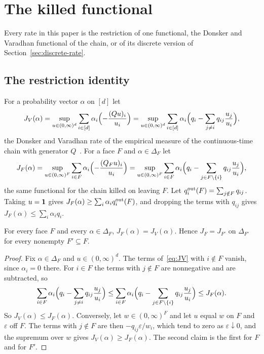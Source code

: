 \section{The killed functional}\label{sec:dv}

Every rate in this paper is the restriction of one functional, the Donsker and
Varadhan functional of the chain, or of its discrete version of
Section~\ref{sec:discrete-rate}.

\subsection{The restriction identity}\label{sec:restriction}

For a probability vector $\alpha$ on $[d]$ let
\begin{equation}\label{eq:JV}
 J_V(\alpha)=\sup_{u\in(0,\infty)^d}\sum_{i\in[d]}\alpha_i\Bigl(-\frac{(Qu)_i}{u_i}\Bigr)
 =\sup_{u\in(0,\infty)^d}\sum_{i\in[d]}\alpha_i\Bigl(q_i-\sum_{j\ne i}q_{ij}\frac{u_j}{u_i}\Bigr),
\end{equation}
the Donsker and Varadhan rate of the empirical measure of the continuous-time
chain with generator $Q$~\cite{dv1975}. For a face $F$ and $\alpha\in\Delta_F$ let
\[
 J_F(\alpha)=\sup_{u\in(0,\infty)^F}\sum_{i\in F}\alpha_i\Bigl(-\frac{(Q_Fu)_i}{u_i}\Bigr)
 =\sup_{u\in(0,\infty)^F}\sum_{i\in F}\alpha_i\Bigl(q_i-\sum_{j\in F\setminus\{i\}}q_{ij}\frac{u_j}{u_i}\Bigr),
\]
the same functional for the chain killed on leaving $F$. Let $q_i^{\rm out}(F)=\sum_{j\notin F}q_{ij}$. Taking $u=\mathbf{1}$
gives $J_F(\alpha)\ge\sum_i\alpha_iq_i^{\rm out}(F)$, and dropping the terms
with $q_{ij}$ gives $J_F(\alpha)\le\sum_i\alpha_iq_i$.

\begin{proposition}\label{prop:restriction}
For every face $F$ and every $\alpha\in\Delta_F$, $J_F(\alpha)=J_V(\alpha)$. Hence
$J_F=J_{F'}$ on $\Delta_{F'}$ for every nonempty $F'\subseteq F$.
\end{proposition}

\begin{proof}
Fix $\alpha\in\Delta_F$ and $u\in(0,\infty)^d$. The terms of~\eqref{eq:JV} with
$i\notin F$ vanish, since $\alpha_i=0$ there. For $i\in F$ the terms with
$j\notin F$ are nonnegative and are subtracted, so
\[
 \sum_{i\in F}\alpha_i\Bigl(q_i-\sum_{j\ne i}q_{ij}\frac{u_j}{u_i}\Bigr)
 \le\sum_{i\in F}\alpha_i\Bigl(q_i-\sum_{j\in F\setminus\{i\}}q_{ij}\frac{u_j}{u_i}\Bigr)
 \le J_F(\alpha).
\]
So $J_V(\alpha)\le J_F(\alpha)$. Conversely, let $w\in(0,\infty)^F$ and let $u$
equal $w$ on $F$ and $\varepsilon$ off $F$. The terms with $j\notin F$ are then
$-q_{ij}\varepsilon/w_i$, which tend to zero as $\varepsilon\downarrow0$, and
the supremum over $w$ gives $J_V(\alpha)\ge J_F(\alpha)$. The second claim is the
first for $F$ and for $F'$.
\end{proof}

